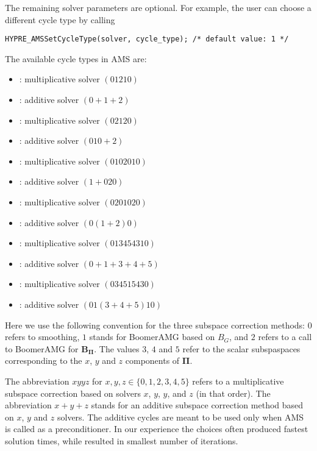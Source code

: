 The remaining solver parameters are optional.
For example, the user can choose a different cycle type by calling
\begin{display}\begin{verbatim}
HYPRE_AMSSetCycleType(solver, cycle_type); /* default value: 1 */
\end{verbatim}\end{display}

\noindent
The available cycle types in AMS are:
\begin{itemize}
\item {}: multiplicative solver $(01210)$
\item {}: additive solver $(0+1+2)$
\item {}: multiplicative solver $(02120)$
\item {}: additive solver $(010+2)$
\item {}: multiplicative solver $(0102010)$
\item {}: additive solver $(1+020)$
\item {}: multiplicative solver $(0201020)$
\item {}: additive solver $(0(1+2)0)$
\item {}: multiplicative solver $(013454310)$
\item {}: additive solver $(0+1+3+4+5)$
\item {}: multiplicative solver $(034515430)$
\item {}: additive solver $(01(3+4+5)10)$
\end{itemize}
Here we use the following convention for the
three subspace correction methods:
$0$ refers to smoothing, $1$ stands for BoomerAMG based on $B_G$, and
$2$ refers to a call to BoomerAMG for ${\mathbf B}_{{\mathbf \Pi}}$.
The values $3$, $4$ and $5$ refer to the scalar subspaspaces
corresponding to the $x$, $y$ and $z$ components of $\mathbf \Pi$.

The abbreviation $xyyz$  for $x,y,z \in \{0,1,2,3,4,5\}$
refers to a multiplicative subspace correction based on solvers $x$, $y$, $y$, and $z$ (in that order).
The abbreviation $x+y+z$ stands for an additive subspace correction method
based on $x$, $y$ and $z$ solvers.
The additive cycles are meant to be used only when AMS is called
as a preconditioner.
In our experience the choices  often produced
fastest solution times, while  resulted in smallest
number of iterations.

